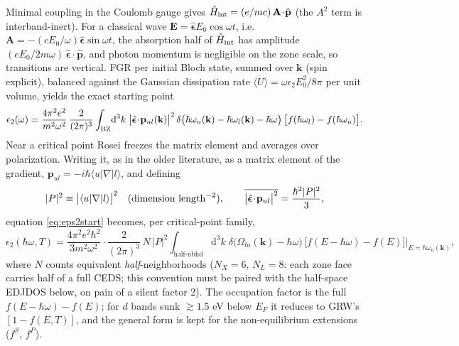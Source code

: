 \documentclass[11pt,a4paper]{article}
\numberwithin{equation}{section}
\newcommand{\hw}{\hbar\omega}
\newcommand{\dd}{\mathrm{d}}
\begin{document}
Minimal coupling in the Coulomb gauge gives
$\hat H_{\rm int}=(e/mc)\,\mathbf A\!\cdot\!\hat{\mathbf p}$ (the $A^2$
term is interband-inert).  For a classical wave
$\mathbf E=\hat{\bm\epsilon}E_0\cos\omega t$, i.e.\
$\mathbf A=-(cE_0/\omega)\hat{\bm\epsilon}\sin\omega t$, the
absorption half of $\hat H_{\rm int}$ has amplitude
$(eE_0/2m\omega)\,\hat{\bm\epsilon}\!\cdot\!\hat{\mathbf p}$, and
photon momentum is negligible on the zone scale, so transitions are
vertical.  FGR per initial Bloch state, summed over $\mathbf k$
(spin explicit), balanced against the Gaussian dissipation rate
$\langle\dot U\rangle=\omega\epsilon_2E_0^2/8\pi$ per unit volume,
yields the exact starting point
\begin{equation}
\epsilon_2(\omega)=\frac{4\pi^2e^2}{m^2\omega^2}\,
\frac{2}{(2\pi)^3}\int_{\rm BZ}\!\dd^3k\;
\bigl|\hat{\bm\epsilon}\!\cdot\!\mathbf p_{ul}(\mathbf k)\bigr|^{2}
\,\delta\bigl(\hbar\omega_u(\mathbf k)-\hbar\omega_l(\mathbf k)-\hw\bigr)
\,\bigl[f(\hbar\omega_l)-f(\hbar\omega_u)\bigr].
\label{eq:eps2start}
\end{equation}
Near a critical point Rosei freezes the matrix element and averages
over polarization.  Writing it, as in the older literature, as a
matrix element of the gradient,
$\mathbf p_{ul}=-i\hbar\langle u|\nabla|l\rangle$, and defining
\begin{equation}
|P|^2\equiv\bigl|\langle u|\nabla|l\rangle\bigr|^2
\quad(\text{dimension }{\rm length}^{-2}),
\qquad
\overline{\bigl|\hat{\bm\epsilon}\!\cdot\!\mathbf p_{ul}\bigr|^2}
=\frac{\hbar^2|P|^2}{3},
\label{eq:Pconvention}
\end{equation}
equation \eqref{eq:eps2start} becomes, per critical-point family,
\begin{equation}
\epsilon_2(\hw,T)=\frac{4\pi^2e^2\hbar^2}{3m^2\omega^2}\cdot
\frac{2}{(2\pi)^3}\,N\,|P|^2
\int_{\text{half-nbhd}}\!\dd^3k\;
\delta\bigl(\Omega_{lu}(\mathbf k)-\hw\bigr)\,
\bigl[f(E-\hw)-f(E)\bigr]\Big|_{E=\hbar\omega_u(\mathbf k)} ,
\label{eq:eps2CP}
\end{equation}
where $N$ counts equivalent \emph{half}-neighborhoods ($N_X=6$,
$N_L=8$: each zone face carries half of a full CEDS; this convention
must be paired with the half-space EDJDOS below, on pain of a silent
factor 2).  The occupation factor is the full
$f(E-\hw)-f(E)$; for $d$ bands sunk $\gtrsim1.5$ eV below $E_F$ it
reduces to GRW's $[1-f(E,T)]$, and the general form is kept for the
non-equilibrium extensions ($f^S$, $f^P$).

\end{document}
